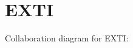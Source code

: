 \hypertarget{group__EXTI}{}\section{E\+X\+TI}
\label{group__EXTI}
Collaboration diagram for E\+X\+TI\+:

